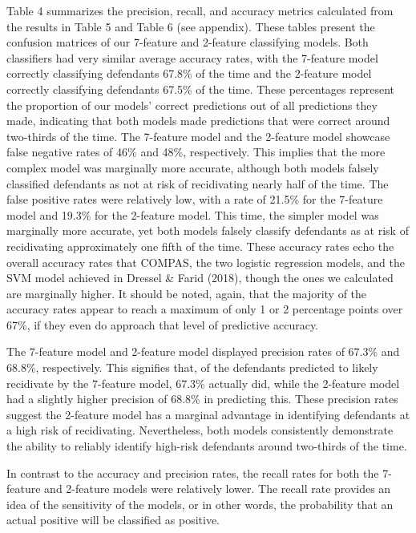 \documentclass[12pt, ]{article}
\begin{document}
Table 4 summarizes the precision, recall, and accuracy metrics
calculated from the results in Table 5 and Table 6 (see appendix). These
tables present the confusion matrices of our 7-feature and 2-feature
classifying models. Both classifiers had very similar average accuracy
rates, with the 7-feature model correctly classifying defendants 67.8\%
of the time and the 2-feature model correctly classifying defendants
67.5\% of the time. These percentages represent the proportion of our
models' correct predictions out of all predictions they made, indicating
that both models made predictions that were correct around two-thirds of
the time. The 7-feature model and the 2-feature model showcase false
negative rates of 46\% and 48\%, respectively. This implies that the
more complex model was marginally more accurate, although both models
falsely classified defendants as not at risk of recidivating nearly half
of the time. The false positive rates were relatively low, with a rate
of 21.5\% for the 7-feature model and 19.3\% for the 2-feature model.
This time, the simpler model was marginally more accurate, yet both
models falsely classify defendants as at risk of recidivating
approximately one fifth of the time. These accuracy rates echo the
overall accuracy rates that COMPAS, the two logistic regression models,
and the SVM model achieved in Dressel \& Farid (2018), though the ones
we calculated are marginally higher. It should be noted, again, that the
majority of the accuracy rates appear to reach a maximum of only 1 or 2
percentage points over 67\%, if they even do approach that level of
predictive accuracy.

The 7-feature model and 2-feature model displayed precision rates of
67.3\% and 68.8\%, respectively. This signifies that, of the defendants
predicted to likely recidivate by the 7-feature model, 67.3\% actually
did, while the 2-feature model had a slightly higher precision of 68.8\%
in predicting this. These precision rates suggest the 2-feature model
has a marginal advantage in identifying defendants at a high risk of
recidivating. Nevertheless, both models consistently demonstrate the
ability to reliably identify high-risk defendants around two-thirds of
the time.

In contrast to the accuracy and precision rates, the recall rates for
both the 7-feature and 2-feature models were relatively lower. The
recall rate provides an idea of the sensitivity of the models, or in
other words, the probability that an actual positive will be classified
as positive.
\end{document}
